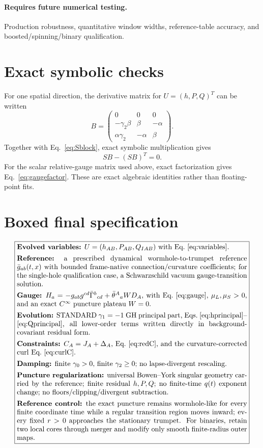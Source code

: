 \documentclass[11pt]{article}
\newcommand{\bg}{\bar g}
\newcommand{\bt}{\bar\theta}
\begin{document}
\paragraph{Requires future numerical testing.}
Production robustness, quantitative window widths, reference-table accuracy, and boosted/spinning/binary qualification.

\section{Exact symbolic checks}
For one spatial direction, the derivative matrix for $U=(h,P,Q)^T$ can be written
\[
B=\begin{pmatrix}
0&0&0\\
-\gamma_2\beta&\beta&-\alpha\\
\alpha\gamma_2&-\alpha&\beta
\end{pmatrix}.
\]
Together with Eq.~\eqref{eq:Sblock}, exact symbolic multiplication gives
\[
SB-(SB)^T=0.
\]
For the scalar relative-gauge matrix used above, exact factorization gives Eq.~\eqref{eq:gaugefactor}. These are exact algebraic identities rather than floating-point fits.

\section{Boxed final specification}
\[
\boxed{\begin{minipage}{0.94\linewidth}
\textbf{Evolved variables:} $U=(h_{AB},P_{AB},Q_{IAB})$ with Eq.~\eqref{eq:variables}.\\[0.4em]
\textbf{Reference:} a prescribed dynamical wormhole-to-trumpet reference $\bg_{ab}(t,x)$ with bounded frame-native connection/curvature coefficients; for the single-hole qualification case, a Schwarzschild vacuum gauge-transition solution.\\[0.4em]
\textbf{Gauge:} $H_a=-g_{ab}g^{cd}\bar\Gamma^b{}_{cd}+\bt^A{}_aWD_A$, with Eq.~\eqref{eq:gauge}, $\mu_L,\mu_S>0$, and an exact $C^\infty$ puncture plateau $W=0$.\\[0.4em]
\textbf{Evolution:} STANDARD $\gamma_1=-1$ GH principal part, Eqs.~\eqref{eq:hprincipal}--\eqref{eq:Qprincipal}, all lower-order terms written directly in background-covariant residual form.\\[0.4em]
\textbf{Constraints:} $C_A=J_A+\Delta_A$, Eq.~\eqref{eq:redC}, and the curvature-corrected curl Eq.~\eqref{eq:curlC}.\\[0.4em]
\textbf{Damping:} finite $\gamma_0>0$, finite $\gamma_2\ge0$; no lapse-divergent rescaling.\\[0.4em]
\textbf{Puncture regularization:} universal Bowen--York singular geometry carried by the reference; finite residual $h,P,Q$; no finite-time $q(t)$ exponent change; no floors/clipping/divergent subtraction.\\[0.4em]
\textbf{Reference control:} the exact puncture remains wormhole-like for every finite coordinate time while a regular transition region moves inward; every fixed $r>0$ approaches the stationary trumpet. For binaries, retain two local cores through merger and modify only smooth finite-radius outer maps.
\end{minipage}}
\]
\end{document}
